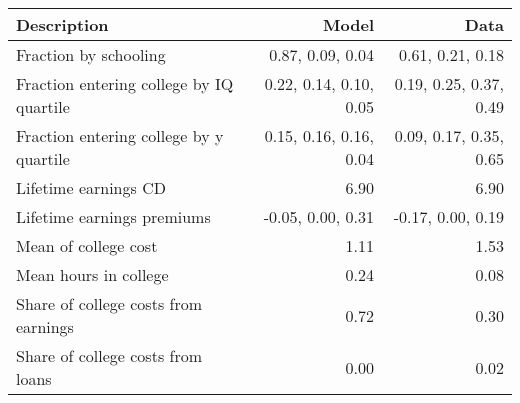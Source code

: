 \begin{tabular}{lrr}
\hline
Description & Model  & Data  \\ 
\hline
Fraction by schooling & 0.87, 0.09, 0.04  & 0.61, 0.21, 0.18  \\ 
Fraction entering college by IQ quartile & 0.22, 0.14, 0.10, 0.05  & 0.19, 0.25, 0.37, 0.49  \\ 
Fraction entering college by y quartile & 0.15, 0.16, 0.16, 0.04  & 0.09, 0.17, 0.35, 0.65  \\ 
Lifetime earnings CD & 6.90  & 6.90  \\ 
Lifetime earnings premiums & -0.05, 0.00, 0.31  & -0.17, 0.00, 0.19  \\ 
Mean of college cost & 1.11  & 1.53  \\ 
Mean hours in college & 0.24  & 0.08  \\ 
Share of college costs from earnings & 0.72  & 0.30  \\ 
Share of college costs from loans & 0.00  & 0.02  \\ 
\hline
\end{tabular}%
